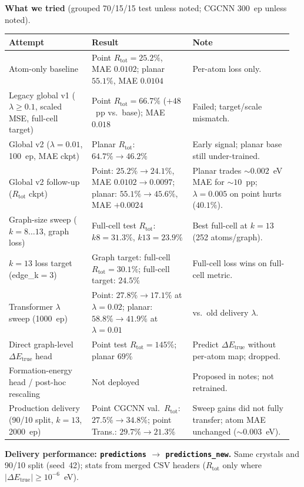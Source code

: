 \documentclass[10pt,a4paper]{article}
\newcommand{\dEtrue}{\Delta E_{\mathrm{true}}}
\begin{document}
\medskip
\noindent\textbf{What we tried} (grouped 70/15/15 test unless noted; CGCNN 300~ep unless noted).

{\small
\begin{tabular}{@{}p{0.28\linewidth}p{0.34\linewidth}p{0.34\linewidth}@{}}
\toprule
Attempt & Result & Note \\
\midrule
Atom-only baseline &
Point $R_{\mathrm{tot}}=25.2\%$, MAE $0.0102$; planar $55.1\%$, MAE $0.0104$ &
Per-atom loss only. \\
Legacy global v1 ($\lambda\ge 0.1$, scaled MSE, full-cell target) &
Point $R_{\mathrm{tot}}=66.7\%$ ($+48$~pp vs.\ base); MAE $0.018$ &
Failed; target/scale mismatch. \\
Global v2 ($\lambda=0.01$, 100~ep, MAE ckpt) &
Planar $R_{\mathrm{tot}}$: $64.7\%\to 46.2\%$ &
Early signal; planar base still under-trained. \\
Global v2 follow-up ($R_{\mathrm{tot}}$ ckpt) &
Point: $25.2\%\to 24.1\%$, MAE $0.0102\!\to\!0.0097$; planar: $55.1\%\to 45.6\%$, MAE $+0.0024$ &
Planar trades ${\sim}0.002$~eV MAE for ${\sim}10$~pp; $\lambda=0.005$ on point hurts ($40.1\%$). \\
Graph-size sweep ($k=8\ldots 13$, graph loss) &
Full-cell test $R_{\mathrm{tot}}$: $k8=31.3\%$, $k13=23.9\%$ &
Best full-cell at $k=13$ (252 atoms/graph). \\
$k=13$ loss target (edge\_k$=3$) &
Graph target: full-cell $R_{\mathrm{tot}}=30.1\%$; full-cell target: $24.5\%$ &
Full-cell loss wins on full-cell metric. \\
Transformer $\lambda$ sweep (1000~ep) &
Point: $27.8\%\to 17.1\%$ at $\lambda=0.02$; planar: $58.8\%\to 41.9\%$ at $\lambda=0.01$ &
vs.\ old delivery $\lambda$. \\
Direct graph-level $\dEtrue$ head &
Point test $R_{\mathrm{tot}}=145\%$; planar $69\%$ &
Predict $\dEtrue$ without per-atom map; dropped. \\
Formation-energy head / post-hoc rescaling &
Not deployed &
Proposed in notes; not retrained. \\
Production delivery (90/10 split, $k=13$, 2000~ep) &
Point CGCNN val.\ $R_{\mathrm{tot}}$: $27.5\%\to 34.8\%$; point Trans.: $29.7\%\to 21.3\%$ &
Sweep gains did not fully transfer; atom MAE unchanged (${\sim}0.003$~eV). \\
\bottomrule
\end{tabular}
}

\medskip
\noindent\textbf{Delivery performance: \texttt{predictions} $\rightarrow$ \texttt{predictions\_new}.}
Same crystals and 90/10 split (seed~42); stats from merged CSV headers ($R_{\mathrm{tot}}$ only where $|\Delta E_{\mathrm{true}}|\ge 10^{-6}$~eV).
\end{document}

